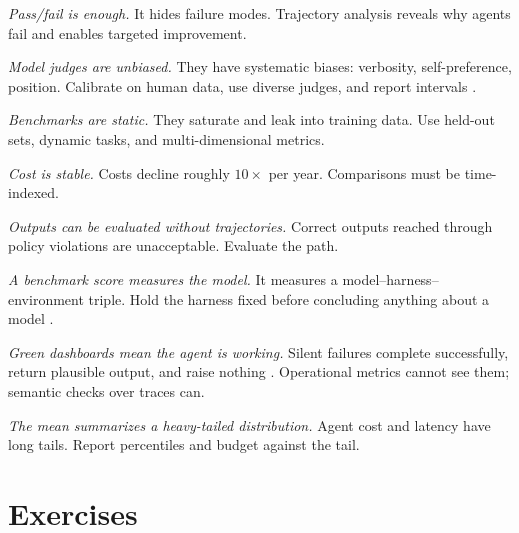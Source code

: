 \documentclass[11pt]{book}
\begin{document}
\textit{Pass/fail is enough.} It hides failure modes. Trajectory analysis reveals why agents fail and enables targeted improvement.

\textit{Model judges are unbiased.} They have systematic biases: verbosity, self-preference, position. Calibrate on human data, use diverse judges, and report intervals \cite{glide2026}.

\textit{Benchmarks are static.} They saturate and leak into training data. Use held-out sets, dynamic tasks, and multi-dimensional metrics.

\textit{Cost is stable.} Costs decline roughly $10\times$ per year. Comparisons must be time-indexed.

\textit{Outputs can be evaluated without trajectories.} Correct outputs reached through policy violations are unacceptable. Evaluate the path.

\textit{A benchmark score measures the model.} It measures a model--harness--environment triple. Hold the harness fixed before concluding anything about a model \cite{modelharness2026, uniace2026, harnessdiverge2026}.

\textit{Green dashboards mean the agent is working.} Silent failures complete successfully, return plausible output, and raise nothing \cite{silentfail2026}. Operational metrics cannot see them; semantic checks over traces can.

\textit{The mean summarizes a heavy-tailed distribution.} Agent cost and latency have long tails. Report percentiles and budget against the tail.

\section*{Exercises}
\end{document}
